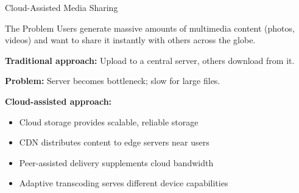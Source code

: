 \documentclass[aspectratio=169,12pt]{beamer}
\begin{document}
\begin{frame}{Cloud-Assisted Media Sharing}
    \begin{block}{The Problem}
        Users generate massive amounts of multimedia content (photos, videos) and want to share it instantly with others across the globe.
    \end{block}
    
    \vspace{0.3cm}
    \textbf{Traditional approach:} Upload to a central server, others download from it.
    
    \textbf{Problem:} Server becomes bottleneck; slow for large files.
    
    \vspace{0.3cm}
    \textbf{Cloud-assisted approach:}
    \begin{itemize}
        \item Cloud storage provides scalable, reliable storage
        \item CDN distributes content to edge servers near users
        \item Peer-assisted delivery supplements cloud bandwidth
        \item Adaptive transcoding serves different device capabilities
    \end{itemize}
\end{frame}
\end{document}
